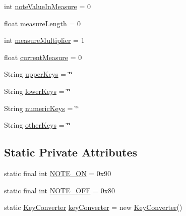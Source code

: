 \begin{DoxyCompactItemize}
\item 
int \hyperlink{classcom_1_1lclion_1_1midiparser_1_1_m_i_d_i_parser_ad1e462120d3438537d08dec3970bc996}{note\+Value\+In\+Measure} = 0
\item 
float \hyperlink{classcom_1_1lclion_1_1midiparser_1_1_m_i_d_i_parser_a77523469bbc99d657ddb184aa2dcb4c7}{measure\+Length} = 0
\item 
int \hyperlink{classcom_1_1lclion_1_1midiparser_1_1_m_i_d_i_parser_a9a55cb81b8582eb4cbbc0a0ef91db56e}{measure\+Multiplier} = 1
\item 
float \hyperlink{classcom_1_1lclion_1_1midiparser_1_1_m_i_d_i_parser_abd6a816e8fe161e38844aeddac581af2}{current\+Measure} = 0
\item 
String \hyperlink{classcom_1_1lclion_1_1midiparser_1_1_m_i_d_i_parser_af186165a05dd64dd883a4697fd0b1d00}{upper\+Keys} = \char`\"{}\char`\"{}
\item 
String \hyperlink{classcom_1_1lclion_1_1midiparser_1_1_m_i_d_i_parser_af2ff13695bae1b9c991aeaa6a7ad3f3c}{lower\+Keys} = \char`\"{}\char`\"{}
\item 
String \hyperlink{classcom_1_1lclion_1_1midiparser_1_1_m_i_d_i_parser_ae95a908b6894c33a614224f731a53b2d}{numeric\+Keys} = \char`\"{}\char`\"{}
\item 
String \hyperlink{classcom_1_1lclion_1_1midiparser_1_1_m_i_d_i_parser_abb638d880a4d9f3c793d9dfae2bd5d65}{other\+Keys} = \char`\"{}\char`\"{}
\end{DoxyCompactItemize}
\subsection*{Static Private Attributes}
\begin{DoxyCompactItemize}
\item 
static final int \hyperlink{classcom_1_1lclion_1_1midiparser_1_1_m_i_d_i_parser_ac035f42f6f27179d122b97d54fd030e1}{N\+O\+T\+E\+\_\+\+O\+N} = 0x90
\item 
static final int \hyperlink{classcom_1_1lclion_1_1midiparser_1_1_m_i_d_i_parser_ac6d1248a531a8620967406d69edda242}{N\+O\+T\+E\+\_\+\+O\+F\+F} = 0x80
\item 
static \hyperlink{classcom_1_1lclion_1_1midiparser_1_1_key_converter}{Key\+Converter} \hyperlink{classcom_1_1lclion_1_1midiparser_1_1_m_i_d_i_parser_acc7c29517d4ac6fb6eb51b8d9b714728}{key\+Converter} = new \hyperlink{classcom_1_1lclion_1_1midiparser_1_1_key_converter}{Key\+Converter}()
\end{DoxyCompactItemize}


